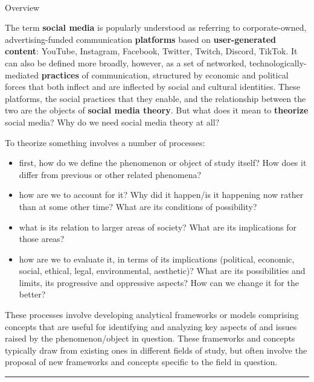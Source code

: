 \documentclass[
  letterpaper,
  DIV=11,
  numbers=noendperiod,
  oneside]{scrartcl}
\makeatletter
\let\oldparagraph\paragraph
\renewcommand{\paragraph}{
    \@ifstar
      \xxxParagraphStar
      \xxxParagraphNoStar
  }
\newcommand{\xxxParagraphStar}[1]{\oldparagraph*{#1}\mbox{}}
\newcommand{\xxxParagraphNoStar}[1]{\oldparagraph{#1}\mbox{}}
\providecommand{\tightlist}{%
  \setlength{\itemsep}{0pt}\setlength{\parskip}{0pt}}\usepackage{longtable,booktabs,array}
\makeatother
\begin{document}
\paragraph{Overview}\label{overview}

The term \textbf{social media} is popularly understood as referring to
corporate-owned, advertising-funded communication \textbf{platforms}
based on \textbf{user-generated content}: YouTube, Instagram, Facebook,
Twitter, Twitch, Discord, TikTok. It can also be defined more broadly,
however, as a set of networked, technologically-mediated
\textbf{practices} of communication, structured by economic and
political forces that both inflect and are inflected by social and
cultural identities. These platforms, the social practices that they
enable, and the relationship between the two are the objects of
\textbf{social media theory}. But what does it mean to \textbf{theorize}
social media? Why do we need social media theory at all?

To theorize something involves a number of processes:

\begin{itemize}
\tightlist
\item
  first, how do we define the phenomenon or object of study itself? How
  does it differ from previous or other related phenomena?
\item
  how are we to account for it? Why did it happen/is it happening now
  rather than at some other time? What are its conditions of
  possibility?
\item
  what is its relation to larger areas of society? What are its
  implications for those areas?
\item
  how are we to evaluate it, in terms of its implications (political,
  economic, social, ethical, legal, environmental, aesthetic)? What are
  its possibilities and limits, its progressive and oppressive aspects?
  How can we change it for the better?
\end{itemize}

These processes involve developing analytical frameworks or models
comprising concepts that are useful for identifying and analyzing key
aspects of and issues raised by the phenomenon/object in question. These
frameworks and concepts typically draw from existing ones in different
fields of study, but often involve the proposal of new frameworks and
concepts specific to the field in question.

\begin{center}\rule{0.5\linewidth}{0.5pt}\end{center}
\end{document}
